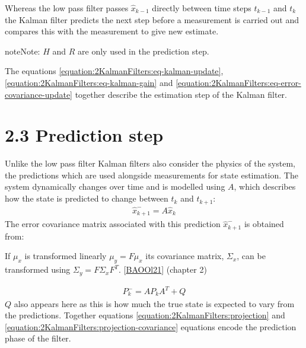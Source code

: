 \documentclass[letterpaper,10pt,english]{jupyterBook}
\begin{document}
\sphinxAtStartPar
Whereas the low pass filter passes \(\hat{x}_{k-1}\) directly between time steps \(t_{k-1}\) and \(t_{k}\) the Kalman filter predicts the next step before a measurement is carried out and compares this with the measurement to give new estimate.

\begin{sphinxadmonition}{note}{Note:}
\sphinxAtStartPar
\(H\) and \(R\) are only used in the prediction step.
\end{sphinxadmonition}

\sphinxAtStartPar
The equations \eqref{equation:2KalmanFilters:eq-kalman-update}, \eqref{equation:2KalmanFilters:eq-kalman-gain} and \eqref{equation:2KalmanFilters:eq-error-covariance-update} together describe the estimation step of the Kalman filter.


\section{2.3 Prediction step}
\label{\detokenize{2KalmanFilters:prediction-step}}
\sphinxAtStartPar
Unlike the low pass filter Kalman filters also consider the physics of the system, the predictions which are used alongside measurements for state estimation. The system dynamically changes over time and is modelled using \(A\), which describes how the state is predicted to change between \(t_k\) and \(t_{k+1}\):
\begin{equation}\label{equation:2KalmanFilters:projection}
\begin{split}\hat{x}^-_{k+1} = A \hat{x}_k\end{split}
\end{equation}
\sphinxAtStartPar
The error covariance matrix associated with this prediction \(\hat{x}^-_{k+1}\) is obtained from:

\begin{sphinxShadowBox}
\sphinxstylesidebartitle{}

\sphinxAtStartPar
If \(\mu_x\) is transformed linearly \(\mu_y = F\mu_x\) its covariance matrix, \(\Sigma_x\), can be transformed using \(\Sigma_y = F\Sigma_xF^T\). {[}\hyperlink{cite.99Bibliography:id3}{BAOOl21}{]} (chapter 2)
\end{sphinxShadowBox}
\begin{equation}\label{equation:2KalmanFilters:projection-covariance}
\begin{split}P^-_k = AP_kA^T+Q\end{split}
\end{equation}
\sphinxAtStartPar
\(Q\) also appears here as this is how much the true state is expected to vary from the predictions. Together equations \eqref{equation:2KalmanFilters:projection} and \eqref{equation:2KalmanFilters:projection-covariance} equations encode the prediction phase of the filter.
\end{document}

